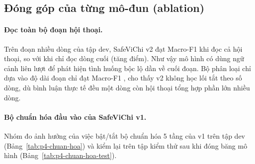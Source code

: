 \subsection{Đóng góp của từng mô-đun (ablation)}
\label{sec:yc3-ablation}

\paragraph{Đọc toàn bộ đoạn hội thoại.}
Trên  đoạn nhiều dòng của tập dev, SafeViChi v2 đạt Macro-F1  khi đọc cả hội thoại, so với
 khi chỉ đọc dòng cuối (tăng  điểm). Như vậy mô hình có dùng ngữ
cảnh liên lượt để phát hiện tình huống bộc lộ dần về cuối đoạn. Bộ phân loại chỉ dựa vào độ dài đoạn chỉ đạt
Macro-F1 , cho thấy v2 không học lối tắt theo số dòng, dù bình luận thực tế đều một dòng còn hội
thoại tổng hợp phần lớn nhiều dòng.

\paragraph{Bộ chuẩn hóa đầu vào của SafeViChi v1.}
Nhóm đo ảnh hưởng của việc bật/tắt bộ chuẩn hóa 5 tầng của v1 trên tập dev (Bảng~\ref{tab:p4-chuan-hoa}) và kiểm lại
trên tập kiểm thử sau khi đóng băng mô hình (Bảng~\ref{tab:p4-chuan-hoa-test}).

